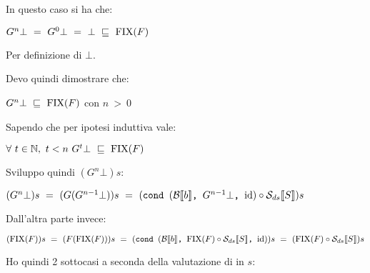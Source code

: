      In questo caso si ha che:
    \begin{center}
    $G^{n}\bot~=~G^{0}\bot~=~\bot~\mineq~\fixp{F}$
    \end{center}
    Per definizione di $\bot$.

     Devo quindi dimostrare che:
    \begin{center}
    $G^{n}\bot~\mineq~\fixp{F}$ con $n~>~0$
    \end{center}
    Sapendo che per ipotesi induttiva vale:
    \begin{center}
    $\forall~t\in\mathbb{N},~t<n~G^{t}\bot~\mineq~\fixp{F}$
    \end{center}
    Sviluppo quindi $(G^{n}\bot)s$:
    \begin{center}
    $(G^{n}\bot)s~=~(G(G^{n-1}\bot))s~=~
    (\cond{b}{G^{n-1}\bot}{\idDS} \circ \Sds)s$
    \end{center}
    Dall'altra parte invece:
    \begin{center}
    $(\fixp{F})s~=~(F(\fixp{F}))s~=~(\cond{b}{\fixp{F} \circ{} \Sds{}}{\idDS})s~
    =~(\fixp{F} \circ{} \Sds{})s$
    \end{center}
    Ho quindi 2 sottocasi a seconda della valutazione di \Sds{} in $s$:
